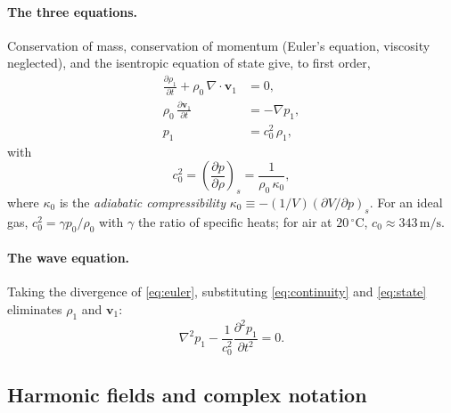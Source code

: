 \documentclass[11pt]{article}
\newcommand{\rrho}{\rho_{0}}
\newcommand{\cc}{c_{0}}
\newcommand{\kkz}{\kappa_{0}}
\newcommand{\vv}{\mathbf{v}}
\begin{document}
\paragraph{The three equations.} Conservation of mass, conservation of momentum
(Euler's equation, viscosity neglected), and the isentropic equation of state
give, to first order,
\begin{subequations}
\begin{align}
  \frac{\partial\rho_{1}}{\partial t}+\rrho\,\nabla\cdot\vv_{1}&=0,
  \label{eq:continuity}\\
  \rrho\,\frac{\partial\vv_{1}}{\partial t}&=-\nabla p_{1},
  \label{eq:euler}\\
  p_{1}&=\cc^{2}\,\rho_{1},
  \label{eq:state}
\end{align}
\end{subequations}
with
\begin{equation}
  \cc^{2}=\left(\frac{\partial p}{\partial\rho}\right)_{\!s}
       =\frac{1}{\rrho\,\kkz},
  \label{eq:soundspeed}
\end{equation}
where $\kkz$ is the \emph{adiabatic compressibility}
$\kkz\equiv -(1/V)(\partial V/\partial p)_{s}$. For an ideal gas,
$\cc^{2}=\gamma p_{0}/\rrho$ with $\gamma$ the ratio of specific heats; for air
at $20\,^{\circ}\mathrm{C}$, $\cc\approx 343\,\mathrm{m/s}$.

\paragraph{The wave equation.} Taking the divergence of
\eqref{eq:euler}, substituting \eqref{eq:continuity} and \eqref{eq:state}
eliminates $\rho_{1}$ and $\vv_{1}$:
\begin{equation}
  \nabla^{2}p_{1}-\frac{1}{\cc^{2}}\frac{\partial^{2}p_{1}}{\partial t^{2}}=0.
  \label{eq:wave}
\end{equation}

\subsection{Harmonic fields and complex notation}
\label{sec:complex}
\end{document}
